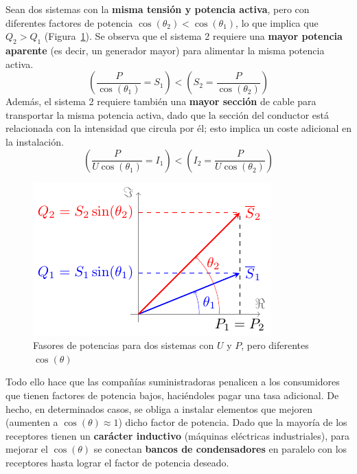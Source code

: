 \documentclass[11pt]{book} %
\numberwithin{dummy}{section}
\theoremstyle{ocrenumbox}
\theoremstyle{blacknumex}
\theoremstyle{blacknumbox}
\theoremstyle{ocrenum}
\begin{document}
	Sean dos sistemas con la \textbf{misma tensión y potencia activa}, pero con diferentes factores de potencia $\cos(\theta_2) < \cos(\theta_1)$, lo que implica que $Q_2 > Q_1$ (Figura~\ref{fig.fasorescompensacionreactiva}). Se observa que el sistema 2 requiere una \textbf{mayor potencia aparente} (es decir, un generador mayor) para alimentar la misma potencia activa.
	\begin{equation*}
		\left(\dfrac{P}{\cos(\theta_1)} = S_1 \right) < \left( S_2 = \dfrac{P}{\cos (\theta_2)}\right) 
	\end{equation*}
	Además, el sistema 2 requiere también una \textbf{mayor sección} de cable para transportar la misma potencia activa, dado que la sección del conductor está relacionada con la intensidad que circula por él; esto implica un coste adicional en la instalación.
	\begin{equation*}
		\left(\frac{P}{U \cos (\theta_1)} = I_1 \right) < \left( I_2 = \frac{P}{U \cos (\theta_2)}\right) 
	\end{equation*}
	\begin{figure}[htbp]
		\centering
		\includegraphics{../figs/fasorescompensacionreactiva.pdf}
		\caption{Fasores de potencias para dos sistemas con $U$ y $P$, pero diferentes $\cos(\theta)$}
		\label{fig.fasorescompensacionreactiva}
	\end{figure} 
	
	Todo ello hace que las compañías suministradoras penalicen a los consumidores que tienen factores de potencia bajos, haciéndoles pagar una tasa adicional. De hecho, en determinados casos, se obliga a instalar elementos que mejoren (aumenten a $\cos(\theta)\approx 1$) dicho factor de potencia. Dado que la mayoría de los receptores tienen un \textbf{carácter inductivo} (máquinas eléctricas industriales), para mejorar el $\cos(\theta)$ se conectan \textbf{bancos de condensadores} en paralelo con los receptores hasta lograr el factor de potencia deseado.
	
\end{document}
